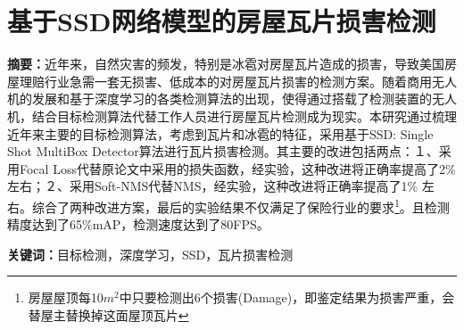\section*{基于SSD网络模型的房屋瓦片损害检测}
\par \noindent
\textbf{\songti {}摘要：}近年来，自然灾害的频发，特别是冰雹对房屋瓦片造成的损害，导致美国房屋理赔行业急需一套无损害、低成本的对房屋瓦片损害的检测方案。随着商用无人机的发展和基于深度学习的各类检测算法的出现，使得通过搭载了检测装置的无人机，结合目标检测算法代替工作人员进行房屋瓦片检测成为现实。本研究通过梳理近年来主要的目标检测算法，考虑到瓦片和冰雹的特征，采用基于SSD: Single Shot MultiBox Detector\cite{ssd}算法进行瓦片损害检测。其主要的改进包括两点：１、采用Focal Loss\cite{focal-loss}代替原论文中采用的损失函数，经实验，这种改进将正确率提高了2\% 左右；２、采用Soft-NMS\cite{soft-nms}代替NMS，经实验，这种改进将正确率提高了1\% 左右。综合了两种改进方案，最后的实验结果不仅满足了保险行业的要求\footnote{房屋屋顶每10$m^2$中只要检测出6个损害(Damage)，即鉴定结果为损害严重，会替屋主替换掉这面屋顶瓦片}。且检测精度达到了65\%mAP，检测速度达到了80FPS。~\\

\par \noindent
\textbf{\songti {}关键词：}{\kaishu {}目标检测，深度学习，SSD，瓦片损害检测}

